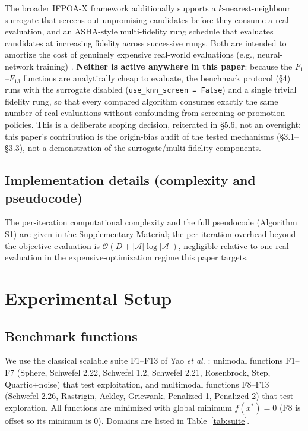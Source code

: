 \documentclass[preprint,12pt]{elsarticle}
\begin{document}
The broader IFPOA-X framework additionally supports a $k$-nearest-neighbour surrogate that screens out unpromising candidates before they consume a real evaluation, and an ASHA-style \cite{li2020asha} multi-fidelity rung schedule that evaluates candidates at increasing fidelity across successive rungs. Both are intended to amortize the cost of genuinely expensive real-world evaluations (e.g., neural-network training) \cite{jin2011surrogate,li2018hyperband,li2020asha}. \textbf{Neither is active anywhere in this paper}: because the $F_1$--$F_{13}$ functions are analytically cheap to evaluate, the benchmark protocol (\S4) runs with the surrogate disabled (\texttt{use\_knn\_screen = False}) and a single trivial fidelity rung, so that every compared algorithm consumes exactly the same number of real evaluations without confounding from screening or promotion policies. This is a deliberate scoping decision, reiterated in \S5.6, not an oversight: this paper's contribution is the origin-bias audit of the tested mechanisms (\S3.1--\S3.3), not a demonstration of the surrogate/multi-fidelity components.

\subsection{Implementation details (complexity and pseudocode)}
\label{subsec3-5}

The per-iteration computational complexity and the full pseudocode (Algorithm S1) are given in the Supplementary Material; the per-iteration overhead beyond the objective evaluation is $\mathcal{O}(D + |\mathcal{A}|\log|\mathcal{A}|)$, negligible relative to one real evaluation in the expensive-optimization regime this paper targets.

\section{Experimental Setup}
\label{sec4}

\subsection{Benchmark functions}
\label{subsec4-1}
We use the classical scalable suite F1--F13 of Yao \emph{et al.} \cite{yao1999evolutionary}: unimodal functions F1--F7 (Sphere, Schwefel 2.22, Schwefel 1.2, Schwefel 2.21, Rosenbrock, Step, Quartic+noise) that test exploitation, and multimodal functions F8--F13 (Schwefel 2.26, Rastrigin, Ackley, Griewank, Penalized 1, Penalized 2) that test exploration. All functions are minimized with global minimum $f(x^*) = 0$ (F8 is offset so its minimum is 0). Domains are listed in Table~\ref{tab:suite}.
\end{document}
